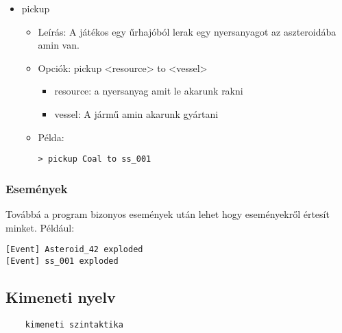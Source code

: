 \documentclass[../../projlab]{subfiles}
\begin{document}
\begin{itemize}
    \item pickup
    \begin{itemize}
        \item Leírás: A játékos egy űrhajóból lerak egy nyersanyagot az aszteroidába amin van.
        \item Opciók: pickup <resource> to <vessel>
        \begin{itemize}
            \item resource: a nyersanyag amit le akarunk rakni
            \item vessel: A jármű amin akarunk gyártani
        \end{itemize}
        \item Példa:
            \begin{verbatim}
> pickup Coal to ss_001
            \end{verbatim}
    \end{itemize}
\end{itemize}

\subsubsection{Események}
Továbbá a program bizonyos események után lehet hogy eseményekről értesít minket.
Például:
\begin{verbatim}
[Event] Asteroid_42 exploded
[Event] ss_001 exploded
\end{verbatim}


\subsection{Kimeneti nyelv}
\begin{verbatim}
    kimeneti szintaktika
\end{verbatim}
\end{document}
